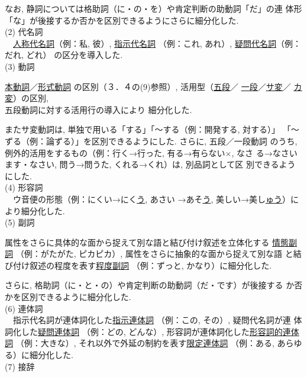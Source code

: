  なお, 静詞については格助詞（に・の・を）や肯定判断の助動詞「だ」の連
体形「な」が後接するか否かを区別できるようにさらに細分化した.\\
(2) 代名詞\\
~~\underline{人称代名詞}（例：私, 彼）, \underline{指示代名詞}
（例：これ, あれ）, \underline{疑問代名詞}（例：だれ, どれ）
の区分を導入した. \\
(3) 動詞

\underline{本動詞}／\hspace*{-0.2mm}\underline{形式動詞}
\hspace*{-0.2mm}の区別（３．４の(9)参照）, 活用型（\hspace*{-0.2mm}\underline{\underline{五段}}／
\hspace*{-0.2mm}\underline{\underline{一段}}／\hspace*{-0.2mm}\underline{\underline{サ変}}／
\hspace*{-0.2mm}\underline{\underline{カ変}}）の区別, \\五段動詞に対する活用行の導入により
細分化した. 

 またサ変動詞は, 単独で用いる「する」「〜する（例：開発する, 対する）」
「〜ずる（例：論ずる）」を区別できるようにした. さらに, 五段／一段動詞
のうち, 例外的活用をするもの（例：行く→行った, 有る→有らない×, なさ
る→なさいます・なさい, 問う→問うた, くれる→くれ）は, 別品詞として区
別できるようにした. \\
(4) 形容詞\\
 ~~ウ音便の形態（例：にくい→にく\underline{う}, あさい
→あそ\underline{う}, 美しい→美し\underline{ゅう}）により細分化した.\\
(5) 副詞

属性をさらに具体的な面から捉えて別な語と結び付け叙述を立体化する
\underline{情態副詞}
（例：がたがた, ピカピカ）, 属性をさらに抽象的な面から捉えて別な語
と結び付け叙述の程度を表す\underline{程度副詞}
（例：ずっと, かなり）に細分化した. 

 さらに, 格助詞（に・と・の）や肯定判断の助動詞（だ・です）が後接する
か否かを区別できるように細分化した. \\
(6) 連体詞\\
~~指示代名詞が連体詞化した\underline{指示連体詞}
（例：この, その）, 疑問代名詞が連
体詞化した\underline{疑問連体詞}
（例：どの, どんな）, 形容詞が連体詞化した\underline{形容詞的連体詞}
（例：大きな）, それ以外で外延の制約を表す\underline{限定連体詞}
（例：ある, あらゆる）に細分化した.\\
(7) 接辞

